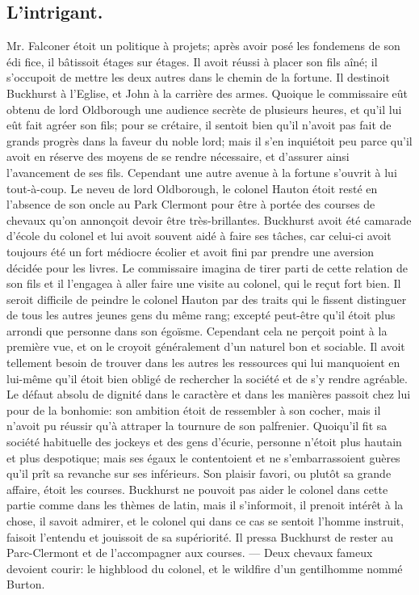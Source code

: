 \subsection{L'intrigant.}
Mr. Falconer étoit un politique à projets;
après avoir posé les fondemens de son édi
fice, il bâtissoit étages sur étages. Il avoit
réussi à placer son fils aîné; il s'occupoit de
mettre les deux autres dans le chemin de la
fortune. Il destinoit Buckhurst à l'Eglise, et
John à la carrière des armes. Quoique le
commissaire eût obtenu de lord Oldborough
une audience secrète de plusieurs heures,
et qu'il lui eût fait agréer son fils; pour se\setcounter{page}{519} crétaire, il sentoit bien qu'il n'avoit pas fait de grands progrès dans la faveur du noble lord; mais il s'en inquiétoit peu parce qu'il avoit en réserve des moyens de se rendre nécessaire, et d'assurer ainsi l'avancement de ses fils.
Cependant une autre avenue à la fortune s'ouvrit à lui tout-à-coup. Le neveu de lord Oldborough, le colonel Hauton étoit resté en l'absence de son oncle au Park Clermont pour être à portée des courses de chevaux qu'on annonçoit devoir être très-brillantes. Buckhurst avoit été camarade d'école du colonel et lui avoit souvent aidé à faire ses tâches, car celui-ci avoit toujours été un fort médiocre écolier et avoit fini par prendre une aversion décidée pour les livres. Le commissaire imagina de tirer parti de cette relation de son fils et il l'engagea à aller faire une visite au colonel, qui le reçut fort bien.
Il seroit difficile de peindre le colonel Hauton par des traits qui le fissent distinguer de tous les autres jeunes gens du même rang; excepté peut-être qu'il étoit plus arrondi que personne dans son égoïsme. Cependant cela ne perçoit point à la première vue, et on le croyoit généralement d'un naturel bon et sociable. Il avoit tellement besoin de trouver dans les autres les ressources qui lui manquoient en lui-même qu'il étoit bien obligé\setcounter{page}{520} de rechercher la société et de s'y rendre agréable. Le défaut absolu de dignité dans le caractère et dans les manières passoit chez lui pour de la bonhomie: son ambition étoit de ressembler à son cocher, mais il n'avoit pu réussir qu'à attraper la tournure de son palfrenier.
Quoiqu'il fit sa société habituelle des jockeys et des gens d'écurie, personne n'étoit plus hautain et plus despotique; mais ses égaux le contentoient et ne s'embarrassoient guères qu'il prît sa revanche sur ses inférieurs.
Son plaisir favori, ou plutôt sa grande affaire, étoit les courses. Buckhurst ne pouvoit pas aider le colonel dans cette partie comme dans les thèmes de latin, mais il s'informoit, il prenoit intérêt à la chose, il savoit admirer, et le colonel qui dans ce cas se sentoit l'homme instruit, faisoit l'entendu et jouissoit de sa supériorité. Il pressa Buckhurst de rester au Parc-Clermont et de l'accompagner aux courses. — Deux chevaux fameux devoient courir: le highblood du colonel, et le wildfire d'un gentilhomme nommé Burton.
